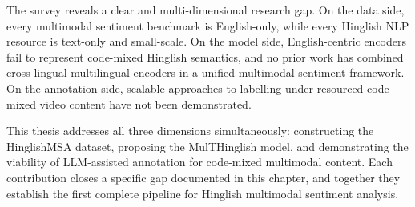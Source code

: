 The survey reveals a clear and multi-dimensional research gap. On the data side, every multimodal sentiment benchmark is English-only, while every Hinglish NLP resource is text-only and small-scale. On the model side, English-centric encoders fail to represent code-mixed Hinglish semantics, and no prior work has combined cross-lingual multilingual encoders in a unified multimodal sentiment framework. On the annotation side, scalable approaches to labelling under-resourced code-mixed video content have not been demonstrated.

This thesis addresses all three dimensions simultaneously: constructing the HinglishMSA dataset, proposing the MulTHinglish model, and demonstrating the viability of LLM-assisted annotation for code-mixed multimodal content. Each contribution closes a specific gap documented in this chapter, and together they establish the first complete pipeline for Hinglish multimodal sentiment analysis.

\newpage